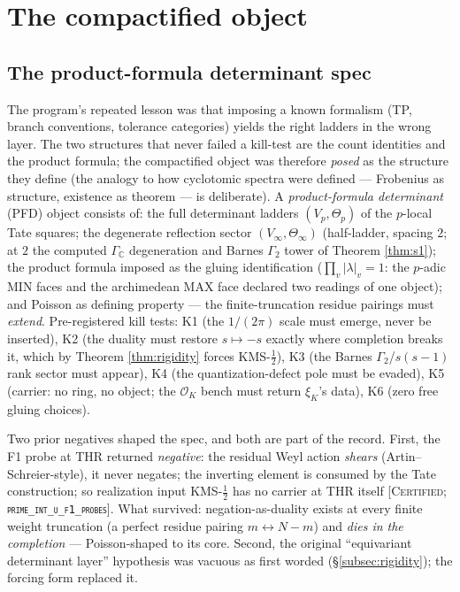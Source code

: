\documentclass[11pt,reqno]{amsart}
\theoremstyle{plain}
\theoremstyle{definition}
\theoremstyle{remark}
\newcommand{\C}{\mathbb{C}}
\newcommand{\grade}[1]{\textup{[\textsc{#1}]}}
\begin{document}
\section{The compactified object}\label{sec:compact}

\subsection{The product-formula determinant spec}

The program's repeated lesson was that imposing a known formalism (TP, branch conventions,
tolerance categories) yields the right ladders in the wrong layer. The two structures that
never failed a kill-test are the count identities and the product formula; the compactified
object was therefore \emph{posed} as the structure they define (the analogy to how cyclotomic
spectra were defined --- Frobenius as structure, existence as theorem --- is deliberate). A
\emph{product-formula determinant} (PFD) object consists of: the full determinant ladders
$(V_p, \Theta_p)$ of the $p$-local Tate squares; the degenerate reflection sector
$(V_\infty, \Theta_\infty)$ (half-ladder, spacing $2$; at $2$ the computed $\Gamma_\C$
degeneration and Barnes $\Gamma_2$ tower of Theorem \ref{thm:s1}); the product formula
imposed as the gluing identification ($\prod_v |\lambda|_v = 1$: the $p$-adic MIN faces and
the archimedean MAX face declared two readings of one object); and Poisson as defining
property --- the finite-truncation residue pairings must \emph{extend}. Pre-registered kill
tests: K1 (the $1/(2\pi)$ scale must emerge, never be inserted), K2 (the duality must restore
$s \mapsto -s$ exactly where completion breaks it, which by Theorem \ref{thm:rigidity} forces
KMS-$\tfrac12$), K3 (the Barnes $\Gamma_2$/$s(s-1)$ rank sector must appear), K4 (the
quantization-defect pole must be evaded), K5 (carrier: no ring, no object; the
$\mathcal{O}_K$ bench must return $\xi_K$'s data), K6 (zero free gluing choices).

Two prior negatives shaped the spec, and both are part of the record. First, the F1 probe at
THR returned \emph{negative}: the residual Weyl action \emph{shears} (Artin--Schreier-style),
it never negates; the inverting element is consumed by the Tate construction; so realization
input KMS-$\tfrac12$ has no carrier at THR itself
\grade{Certified; \texttt{prime\_\allowbreak int\_\allowbreak u\_\allowbreak f1\_\allowbreak probes}}. What survived: negation-as-duality
exists at every finite weight truncation (a perfect residue pairing $m \leftrightarrow N-m$)
and \emph{dies in the completion} --- Poisson-shaped to its core. Second, the original
``equivariant determinant layer'' hypothesis was vacuous as first worded
(\S\ref{subsec:rigidity}); the forcing form replaced it.
\end{document}

